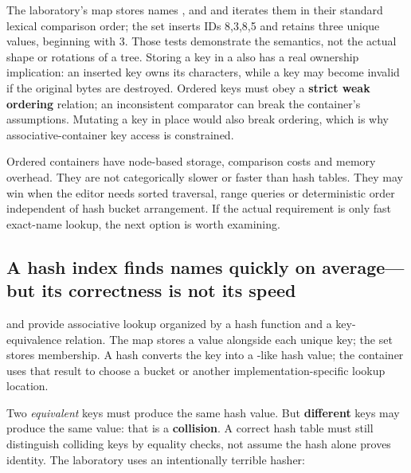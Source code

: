 The laboratory's map stores names ,  and  and iterates them in their standard lexical comparison order; the set inserts IDs 8,3,8,5 and retains three unique values, beginning with 3. Those tests demonstrate the semantics, not the actual shape or rotations of a tree. Storing a key in a  also has a real ownership implication: an inserted  key owns its characters, while a  key may become invalid if the original bytes are destroyed. Ordered keys must obey a \textbf{strict weak ordering} relation; an inconsistent comparator can break the container's assumptions. Mutating a key in place would also break ordering, which is why associative-container key access is constrained.

Ordered containers have node-based storage, comparison costs and memory overhead. They are not categorically slower or faster than hash tables. They may win when the editor needs sorted traversal, range queries or deterministic order independent of hash bucket arrangement. If the actual requirement is only fast exact-name lookup, the next option is worth examining.

\subsection{A hash index finds names quickly on average---but its correctness is not its speed}\label{05-engine-i-ch005-a-hash-index-finds-names-quickly-on-averagebut-its-correctness-is-not-its-speed}

\hypertarget{05-engine-i-ch005-a-hash-index-finds-names-quickly-on-averagebut-its-correctness-is-not-its-speed}{}

 and  provide associative lookup organized by a hash function and a key-equivalence relation. The map stores a value alongside each unique key; the set stores membership. A hash converts the key into a -like hash value; the container uses that result to choose a bucket or another implementation-specific lookup location.

Two \emph{equivalent} keys must produce the same hash value. But \textbf{different} keys may produce the same value: that is a \textbf{collision}. A correct hash table must still distinguish colliding keys by equality checks, not assume the hash alone proves identity. The laboratory uses an intentionally terrible hasher:


